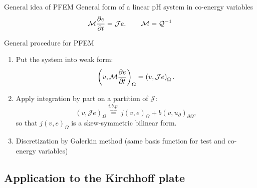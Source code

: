 \documentclass[aspectratio=169]{ISAE-Beamer}
\begin{document}
\begin{frame}{General idea of PFEM}
General form of a linear pH system in co-energy variables
\begin{equation*}
\mathcal{M} \diffp{e}{t} = \mathcal{J} e, \qquad \mathcal{M} = \mathcal{Q}^{-1}
\end{equation*}

\begin{block}{General procedure for PFEM}
	\setlength{\abovedisplayskip}{1pt}
	\setlength{\belowdisplayskip}{1pt}
	\begin{enumerate}
		\item Put the system into weak form:
		\begin{equation*}
		\left(v, \mathcal{M} \diffp{e}{t} \right)_{\Omega} = \left(v, \mathcal{J} e \right)_{\Omega}.
		\end{equation*}
		\item Apply integration by part on a partition of $\mathcal{J}$:
		\begin{equation*}
		\left(v, \mathcal{J} e \right)_{\Omega} \overbrace{=}^{i.b.p.} j(v, e)_{\Omega} + b(v, u_\partial)_{\partial \Omega},
		\end{equation*}
		so that $j(v, e)_{\Omega}$ is a skew-symmetric bilinear form.
		\item Discretization by Galerkin method (same basis function for test and co-energy variables)
	\end{enumerate}
\end{block}
\end{frame}

\subsection{Application to the Kirchhoff plate}
\end{document}
